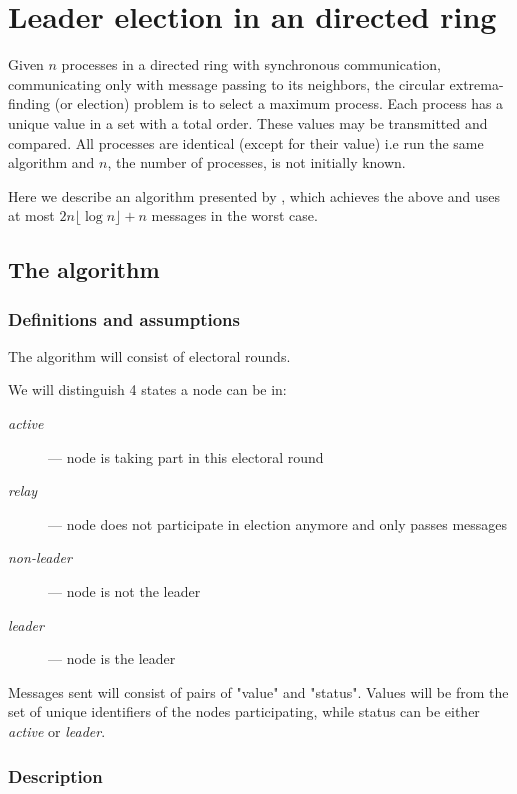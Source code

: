 \documentclass{article}
\begin{document}
\section*{Leader election in an directed ring}

Given $n$ processes in a directed ring with synchronous communication, communicating only with message passing to its neighbors, the circular extrema-finding (or election) problem is to select a maximum process. Each process has a unique value in a set with a total order. These values may be transmitted and compared. All processes are identical (except for their value) i.e run the same algorithm and $n$, the number of processes, is not initially known.

Here we describe an algorithm presented by \cite{10.1145/69622.357194}, which achieves the above and uses at most $2 n \lfloor\log n\rfloor + n$ messages in the worst case.
\subsection*{The algorithm}
\subsubsection*{Definitions and assumptions}
The algorithm will consist of electoral rounds.

We will distinguish 4 states a node can be in:
\begin{description}

\item[\textit{active}] --- node is taking part in this electoral round
\item[\textit{relay}] --- node does not participate in election anymore and only passes messages
\item[\textit{non-leader}] --- node is not the leader
\item[\textit{leader}] --- node is the leader

\end{description}

Messages sent will consist of pairs of "value" and "status". Values will be from the set of unique identifiers of the nodes participating, while status can be either \textit{active} or \textit{leader}.

\subsubsection*{Description}
\end{document}
